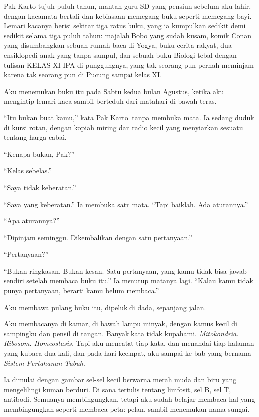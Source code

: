 \documentclass[11pt,twoside,openany]{book}
\makeatletter
\newcommand{\scenebreak}{\par\vspace{0.9em}{\centering\textsc{*\hspace{0.7em}*\hspace{0.7em}*}\par}\vspace{0.9em}\@afterindentfalse\@afterheading}
\makeatother
\begin{document}
Pak Karto tujuh puluh tahun, mantan guru SD yang pensiun sebelum aku lahir, dengan kacamata bertali dan kebiasaan memegang buku seperti memegang bayi. Lemari kacanya berisi sekitar tiga ratus buku, yang ia kumpulkan sedikit demi sedikit selama tiga puluh tahun: majalah Bobo yang sudah kusam, komik Conan yang disumbangkan sebuah rumah baca di Yogya, buku cerita rakyat, dua ensiklopedi anak yang tanpa sampul, dan sebuah buku Biologi tebal dengan tulisan KELAS XI IPA di punggungnya, yang tak seorang pun pernah meminjam karena tak seorang pun di Pucung sampai kelas XI.

Aku menemukan buku itu pada Sabtu kedua bulan Agustus, ketika aku mengintip lemari kaca sambil berteduh dari matahari di bawah teras.

``Itu bukan buat kamu,'' kata Pak Karto, tanpa membuka mata. Ia sedang duduk di kursi rotan, dengan kopiah miring dan radio kecil yang menyiarkan sesuatu tentang harga cabai.

``Kenapa bukan, Pak?''

``Kelas sebelas.''

``Saya tidak keberatan.''

``Saya yang keberatan.'' Ia membuka satu mata. ``Tapi baiklah. Ada aturannya.''

``Apa aturannya?''

``Dipinjam seminggu. Dikembalikan dengan satu pertanyaan.''

``Pertanyaan?''

``Bukan ringkasan. Bukan kesan. Satu pertanyaan, yang kamu tidak bisa jawab sendiri setelah membaca buku itu.'' Ia menutup matanya lagi. ``Kalau kamu tidak punya pertanyaan, berarti kamu belum membaca.''

Aku membawa pulang buku itu, dipeluk di dada, sepanjang jalan.

\scenebreak
Aku membacanya di kamar, di bawah lampu minyak, dengan kamus kecil di sampingku dan pensil di tangan. Banyak kata tidak kupahami. \emph{Mitokondria. Ribosom. Homeostasis.} Tapi aku mencatat tiap kata, dan menandai tiap halaman yang kubaca dua kali, dan pada hari keempat, aku sampai ke bab yang bernama \emph{Sistem Pertahanan Tubuh}.

Ia dimulai dengan gambar sel-sel kecil berwarna merah muda dan biru yang mengelilingi kuman berduri. Di sana tertulis tentang limfosit, sel B, sel T, antibodi. Semuanya membingungkan, tetapi aku sudah belajar membaca hal yang membingungkan seperti membaca peta: pelan, sambil menemukan nama sungai.
\end{document}
